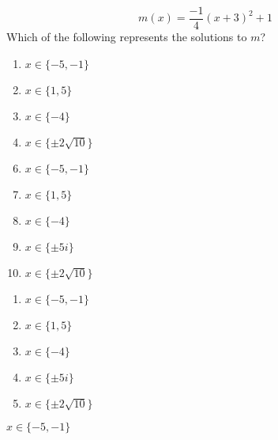  
$$m(x)=\frac{-1}{4}(x+3)^2+1$$
Which of the following represents the solutions to $m$? 


\ifsat
	\begin{enumerate}[label=\Alph*)]
		\item $x\in\{-5,-1\} $ %
		\item $x\in\{1,5\} $ 
		\item $x\in\{-4\} $ 
		\item $x\in\{\pm 2\sqrt{10}\}$
	\end{enumerate}
\else
\fi

\ifacteven
	\begin{enumerate}[label=\textbf{\Alph*.},itemsep=\fill,align=left]
		\setcounter{enumii}{5}
		\item $x\in\{-5,-1\} $ %
		\item $x\in\{1,5\} $ 
		\item $x\in\{-4\} $ 
		\addtocounter{enumii}{1}
		\item $x\in\{\pm 5i\} $
		\item $x\in\{\pm 2\sqrt{10}\}$
	\end{enumerate}
\else
\fi

\ifactodd
	\begin{enumerate}[label=\textbf{\Alph*.},itemsep=\fill,align=left]
		\item $x\in\{-5,-1\} $ %
		\item $x\in\{1,5\} $ 
		\item $x\in\{-4\} $ 
		\item $x\in\{\pm 5i\} $
		\item $x\in\{\pm 2\sqrt{10}\}$
	\end{enumerate}
\else
\fi

\ifgridin
 $x\in\{-5,-1\} $ %
		
\else
\fi

